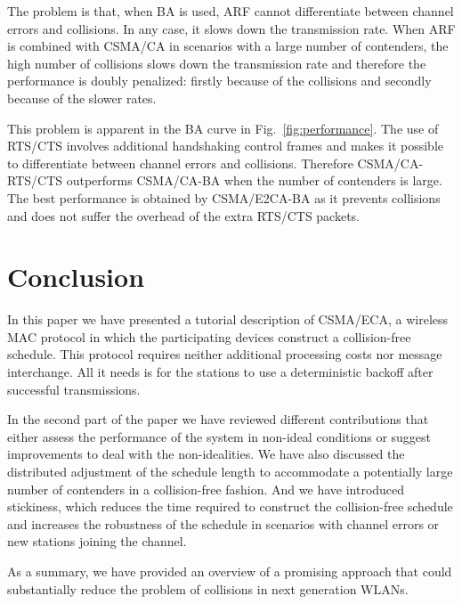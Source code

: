 \documentclass[journal]{IEEEtran}
\begin{document}
The problem is that, when BA is used, ARF cannot differentiate between channel errors and collisions.
In any case, it slows down the transmission rate.
When ARF is combined with CSMA/CA in scenarios with a large number of contenders, the high number of collisions slows down the transmission rate and therefore the performance is doubly penalized: firstly because of the collisions and secondly because of the slower rates.

This problem is apparent in the BA curve in Fig.~\ref{fig:performance}.
The use of RTS/CTS involves additional handshaking control frames and makes it possible to differentiate between channel errors and collisions.
Therefore CSMA/CA-RTS/CTS outperforms CSMA/CA-BA when the number of contenders is large.
The best performance is obtained by CSMA/E2CA-BA as it prevents collisions and does not suffer the overhead of the extra RTS/CTS packets.


\section{Conclusion} \label{sec:conclusion}
In this paper we have presented a tutorial description of CSMA/ECA, a wireless MAC protocol in which the participating devices construct a collision-free schedule.
This protocol requires neither additional processing costs nor message interchange.
All it needs is for the stations to use a deterministic backoff after successful transmissions.


In the second part of the paper we have reviewed different contributions that either assess the performance of the system in non-ideal conditions or suggest improvements to deal with the non-idealities.
We have also discussed the distributed adjustment of the schedule length to accommodate a potentially large number of contenders in a collision-free fashion.
And we have introduced stickiness, which reduces the time required to construct the collision-free schedule and increases the robustness of the schedule in scenarios with channel errors or new stations joining the channel.

As a summary, we have provided an overview of a promising approach that could substantially reduce the problem of collisions in next generation WLANs.
\end{document}
